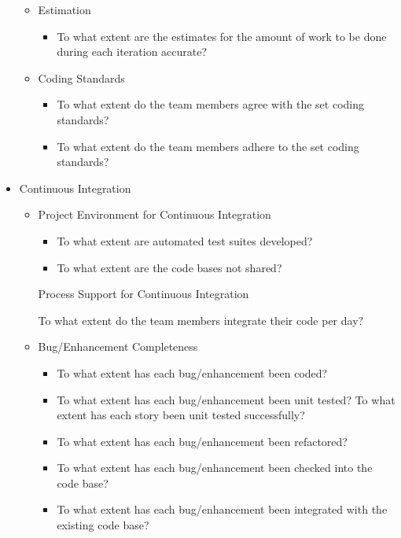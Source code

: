 \begin{appendices}
\begin{itemize}
\begin{itemize}
			\item Estimation
				\begin{itemize}
					\item To what extent are the estimates for the amount of work to be done during each iteration accurate?
				\end{itemize}
			\item Coding Standards
				\begin{itemize}
					\item To what extent do the team members agree with the set coding standards? 
					\item To what extent do the team members adhere to the set coding standards?
				\end{itemize}
		\end{itemize}
	\item Continuous Integration
		\begin{itemize}
			\item Project Environment for Continuous Integration 
				\begin{itemize}
					\item To what extent are automated test suites developed?
					\item To what extent are the code bases not shared?
				\end{itemize}
				\begin{itemize}
					\addition Process Support for Continuous Integration
						\begin{itemize}
							\addition To what extent do the team members integrate their code per day?
						\end{itemize}
				\end{itemize}
			\item Bug/Enhancement Completeness
				\begin{itemize}
					\item To what extent has each bug/enhancement been coded? 
					\item To what extent has each bug/enhancement been unit tested? 
					\addition To what extent has each story been unit tested successfully?
					\item To what extent has each bug/enhancement been refactored? 
					\item To what extent has each bug/enhancement been checked into the code base? 
					\item To what extent has each bug/enhancement been integrated with the existing code base? 

\end{itemize}
\end{itemize}
\end{itemize}
\end{appendices}
